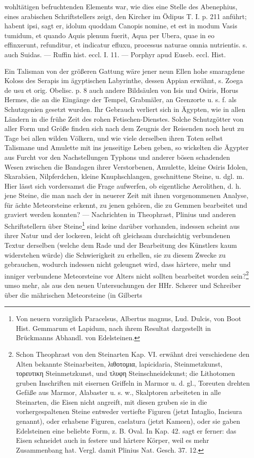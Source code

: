 \documentclass[a4paper, 11pt, oneside, polutonikogreek, german]{article}
\begin{document}
wohltätigen befruchtenden Elements war, wie dies eine Stelle des Abenephius, eines arabischen Schriftstellers zeigt, den Kircher im Ödipus T. I. p. 211 anführt; habent ipsi, sagt er, idolum quoddam Canopis nomine, et est in modum Vasis tumidum, et quando Aquis plenum fuerit, Aqua per Ubera, quae in eo effinxerunt, refunditur, et indicatur efluxu, processus naturae omnia nutrientis. s. auch Suidas. --- Ruffin hist. eccl. I. 11. --- Porphyr apud Euseb. eccl. Hist.

Ein Talisman von der größeren Gattung wäre jener neun Ellen hohe smaragdene Koloss des Serapis im ägyptischen Labyrinthe, dessen Appian erwähnt, s. Zoega de usu et orig. Obelisc. p. 8 auch andere Bildsäulen von Isis und Osiris, Horus Hermes, die an die Eingänge der Tempel, Grabmäler, an Grenzorte u. s. f. als Schutzgenien gesetzt wurden. Ihr Gebrauch verliert sich in Ägypten, wie in allen Ländern in die frühe Zeit des rohen Fetischen-Dienstes. Solche Schutzgötter von aller Form und Größe finden sich nach dem Zeugnis der Reisenden noch heut zu Tage bei allen wilden Völkern, und wie viele derselben ihren Toten selbst Talismane und Amulette mit ins jenseitige Leben geben, so wickelten die Ägypter aus Furcht vor den Nachstellungen Typhons und anderer bösen schadenden Wesen zwischen die Bandagen ihrer Verstorbenen, Amulette, kleine Osiris Idolen, Skarabäen, Nilpferdchen, kleine Knuphschlangen, geschnittene Steine, u. dgl. m. Hier lässt sich vordersamst die Frage aufwerfen, ob eigentliche Aerolithen, d. h. jene Steine, die man nach der in neuerer Zeit mit ihnen vorgenommenen Analyse, für ächte Meteorsteine erkennt, zu jenen gehören, die zu Gemmen bearbeitet und graviert werden konnten? --- Nachrichten in Theophrast, Plinius und anderen Schriftstellern über Steine\footnote{Von neuern vorzüglich Paracelsus, Albertus magnus, Lud. Dulcis, von Boot Hist. Gemmarum et Lapidum, nach ihrem Resultat dargestellt in Brückmanns Abhandl. von Edelsteinen.} sind keine darüber vorhanden, indessen scheint aus ihrer Natur und der lockeren, leicht oft gleichsam durchsichtig verbundenen Textur derselben (welche dem Rade und der Bearbeitung des Künstlers kaum widerstehen würde) die Schwierigkeit zu erhellen, sie zu diesem Zwecke zu gebrauchen, wodurch indessen nicht geleugnet wird, dass härtere, mehr und inniger verbundene Meteorsteine vor Alters nicht sollten bearbeitet worden sein?\footnote{Schon Theophrast von den Steinarten Kap. VI. erwähnt drei verschiedene den Alten bekannte Steinarbeiten, λιθοτομια, lapicidaria, Steinmetzkunst, τορευτικη Steinmetzkunst, und τλυφη Steinschneidekunst; die Lithotomen gruben Inschriften mit eisernen Griffeln in Marmor u. d. gl., Toreuten drehten Gefäße aus Marmor, Alabaster u. s. w., Skalptoren arbeiteten in alle Steinarten, die Eisen nicht angreift, mit diesen gruben sie in die vorhergespaltenen Steine entweder vertiefte Figuren (jetzt Intaglio, Incisura genannt), oder erhabene Figuren, caelatura (jetzt Kameen), oder sie gaben Edelsteinen eine beliebte Form, z. B. Oval. In Kap. 42. sagt er ferner: das Eisen schneidet auch in festere und härtere Körper, weil es mehr Zusammenbang hat. Vergl. damit Plinius Nat. Gesch. 37. 12.} umso mehr, als aus den neuen Untersuchungen der HHr. Scherer und Schreiber über die mährischen Meteorsteine (in Gilberts 
\end{document}
